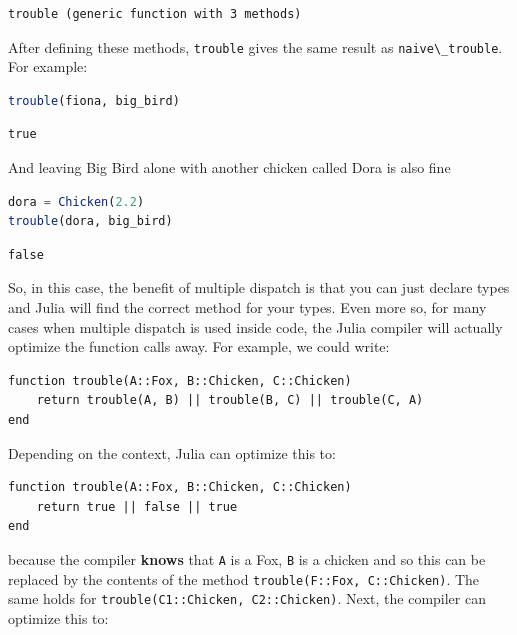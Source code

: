 \documentclass[
  notoc %
]{tufte-book}
\newcommand{\passthrough}[1]{#1}
\begin{document}
\begin{lstlisting}[language=Output]
trouble (generic function with 3 methods)
\end{lstlisting}

After defining these methods, \passthrough{\lstinline!trouble!} gives
the same result as \passthrough{\lstinline!naive\_trouble!}. For
example:

\begin{lstlisting}[language=Julia]
trouble(fiona, big_bird)
\end{lstlisting}

\begin{lstlisting}[language=Output]
true
\end{lstlisting}

And leaving Big Bird alone with another chicken called Dora is also fine

\begin{lstlisting}[language=Julia]
dora = Chicken(2.2)
trouble(dora, big_bird)
\end{lstlisting}

\begin{lstlisting}[language=Output]
false
\end{lstlisting}

So, in this case, the benefit of multiple dispatch is that you can just
declare types and Julia will find the correct method for your types.
Even more so, for many cases when multiple dispatch is used inside code,
the Julia compiler will actually optimize the function calls away. For
example, we could write:

\begin{lstlisting}
function trouble(A::Fox, B::Chicken, C::Chicken)
    return trouble(A, B) || trouble(B, C) || trouble(C, A)
end
\end{lstlisting}

Depending on the context, Julia can optimize this to:

\begin{lstlisting}
function trouble(A::Fox, B::Chicken, C::Chicken)
    return true || false || true
end
\end{lstlisting}

because the compiler \textbf{knows} that \passthrough{\lstinline!A!} is
a Fox, \passthrough{\lstinline!B!} is a chicken and so this can be
replaced by the contents of the method
\passthrough{\lstinline!trouble(F::Fox, C::Chicken)!}. The same holds
for \passthrough{\lstinline!trouble(C1::Chicken, C2::Chicken)!}. Next,
the compiler can optimize this to:
\end{document}

